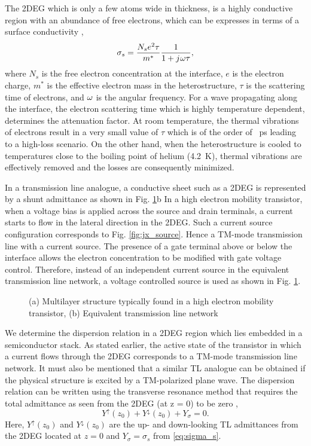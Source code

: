 \documentclass[11pt]{article}
\begin{document}
The 2DEG which is only a few atoms wide in thickness, is a highly conductive region with an abundance of free electrons, which can be expresses in terms of a surface conductivity \cite{Burke2000},
%
\begin{equation}
  \sigma_s = \frac{N_s e^2 \tau}{m^{\ast}}\frac{1}{1 + j\mkern1mu \omega \tau},
  \label{eq:sigma_s}
\end{equation}
%
where $N_s$ is the free electron concentration at the interface, $e$ is the electron charge, $m^{\ast}$ is the effective electron mass in the heterostructure, $\tau$ is the scattering time of electrons, and $\omega$ is the angular frequency. For a wave propagating along the interface, the electron scattering time which is highly temperature dependent, determines the attenuation factor. At room temperature, the thermal vibrations of electrons result in a very small value of $\tau$ which is of the order of \SI{}{\ps} leading to a high-loss scenario. On the other hand, when the heterostructure is cooled to temperatures close to the boiling point of helium (\SI{4.2}{\kelvin}), thermal vibrations are effectively removed and the losses are consequently minimized.

In a transmission line analogue, a conductive sheet such as a 2DEG is represented by a shunt admittance as shown in Fig. \ref{fig:TL_equivalent}b In a high electron mobility transistor, when a voltage bias is applied across the source and drain terminals, a current starts to flow in the lateral direction in the 2DEG. Such a current source configuration corresponds to Fig. \ref{fig:jx_source}. Hence a TM-mode transmission line with a current source. The presence of a gate terminal above or below the interface allows the electron concentration to be modified with gate voltage control. Therefore, instead of an independent current source in the equivalent transmission line network, a voltage controlled source is used as shown in Fig. \ref{fig:TL_equivalent}.
%
\begin{figure}[t!]
  \centering
  \def\svgwidth{\linewidth}
  
  \caption{(a) Multilayer structure typically found in a high electron mobility transistor, (b) Equivalent transmission line network}
  \label{fig:TL_equivalent}
\end{figure}
%

We determine the dispersion relation in a 2DEG region which lies embedded in a semiconductor stack. As stated earlier, the active state of the transistor in which a current flows through the 2DEG corresponds to a TM-mode transmission line network. It must also be mentioned that a similar TL analogue can be obtained if the physical structure is excited by a TM-polarized plane wave. The dispersion relation can be written using the transverse resonance method that requires the total admittance as seen from the 2DEG (at z = 0) to be zero \cite{Gomez-Diaz2012},
%
\begin{equation}
  Y^{\uparrow}(z_0) + Y^{\downarrow}(z_0) + Y_{\sigma} = 0.
  \label{eq:dispersion}
\end{equation}
%
Here, $Y^{\uparrow}(z_0)$ and $Y^{\downarrow}(z_0)$ are the up- and down-looking TL admittances from the 2DEG located at $z = 0$ and $Y_{\sigma} = \sigma_s$ from \eqref{eq:sigma_s}.
\end{document}
